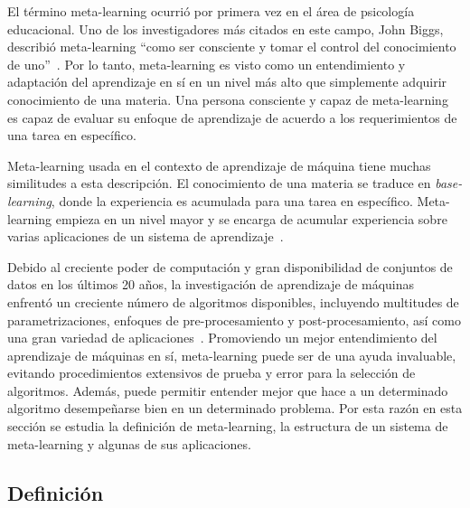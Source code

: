 
El término meta-learning ocurrió por primera vez en el área de psicología educacional. Uno de los investigadores más citados en este campo, John Biggs, describió meta-learning ``como ser consciente y tomar el control del conocimiento de uno''~\cite{biggs1985role}. Por lo tanto, meta-learning es visto como un entendimiento y adaptación del aprendizaje en sí en un nivel más alto que simplemente adquirir conocimiento de una materia. Una persona consciente y capaz de meta-learning es capaz de evaluar su enfoque de aprendizaje de acuerdo a los requerimientos de una tarea en específico.

Meta-learning usada en el contexto de aprendizaje de máquina tiene muchas similitudes a esta descripción. El conocimiento de una materia se traduce en \textit{base-learning}, donde la experiencia es acumulada para una tarea en específico. Meta-learning empieza en un nivel mayor y se encarga de acumular experiencia sobre varias aplicaciones de un sistema de aprendizaje~\cite{hospedales2021metalearning}.

Debido al creciente poder de computación y gran disponibilidad de conjuntos de datos en los últimos 20 años, la investigación de aprendizaje de máquinas enfrentó un creciente número de algoritmos disponibles, incluyendo multitudes de parametrizaciones, enfoques de pre-procesamiento y post-procesamiento, así como una gran variedad de aplicaciones~\cite{lemke2013metalearning}. Promoviendo un mejor entendimiento del aprendizaje de máquinas en sí, meta-learning puede ser de una ayuda invaluable, evitando procedimientos extensivos de prueba y error para la selección de algoritmos. Además, puede permitir entender mejor que hace a un determinado algoritmo desempeñarse bien en un determinado problema. Por esta razón en esta sección se estudia la definición de meta-learning, la estructura de un sistema de meta-learning y algunas de sus aplicaciones.

\subsection{Definición}\label{subsec:mtl-definition}

